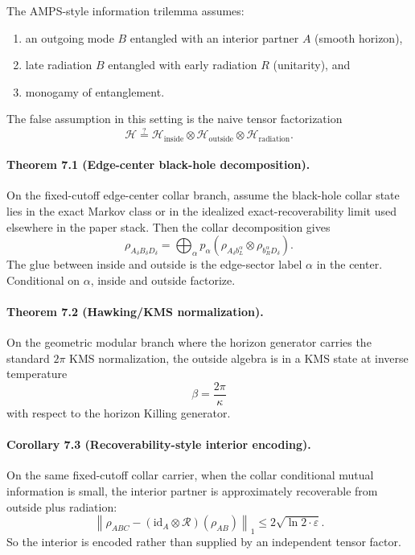 The AMPS-style information trilemma assumes:
\begin{enumerate}[leftmargin=2em]
\item an outgoing mode \(B\) entangled with an interior partner \(A\) (smooth horizon),
\item late radiation \(B\) entangled with early radiation \(R\) (unitarity), and
\item monogamy of entanglement.
\end{enumerate}
The false assumption in this setting is the naive tensor factorization
\[
\mathcal H \stackrel{?}{=}
\mathcal H_{\mathrm{inside}}\otimes
\mathcal H_{\mathrm{outside}}\otimes
\mathcal H_{\mathrm{radiation}}.
\]

\paragraph{\textbf{Theorem 7.1 (Edge-center black-hole decomposition).}}
On the fixed-cutoff edge-center collar branch, assume the black-hole collar state lies in the
exact Markov class or in the idealized exact-recoverability limit used elsewhere in the paper
stack. Then the collar decomposition gives
\[
\rho_{A_\delta B_\delta D_\delta}
=
\bigoplus_\alpha p_\alpha
\left(\rho_{A_\delta b_L^\alpha}\otimes \rho_{b_R^\alpha D_\delta}\right).
\]
The glue between inside and outside is the edge-sector label \(\alpha\) in the center.
Conditional on \(\alpha\), inside and outside factorize.

\paragraph{\textbf{Theorem 7.2 (Hawking/KMS normalization).}}
On the geometric modular branch where the horizon generator carries the standard \(2\pi\) KMS
normalization, the outside algebra is in a KMS state at inverse temperature
\[
\beta=\frac{2\pi}{\kappa}
\]
with respect to the horizon Killing generator.

\paragraph{\textbf{Corollary 7.3 (Recoverability-style interior encoding).}}
On the same fixed-cutoff collar carrier, when the collar conditional mutual information is small,
the interior partner is approximately
recoverable from outside plus radiation:
\[
\left\|
\rho_{ABC}
-
(\mathrm{id}_A\otimes\mathcal R)(\rho_{AB})
\right\|_1
\le
2\sqrt{\ln 2\cdot \varepsilon}.
\]
So the interior is encoded rather than supplied by an independent tensor factor.

